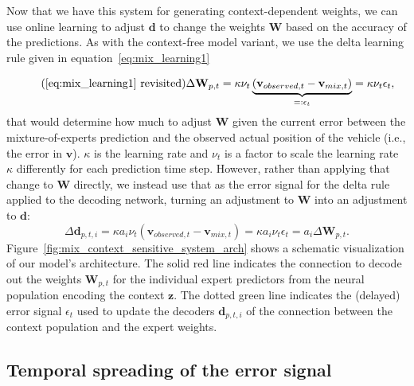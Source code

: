 Now that we have this system for generating context-dependent weights, we can use online learning to adjust $\mathbf{d}$ to change the weights $\mathbf{W}$ based on the accuracy of the predictions. 
As with the context-free model variant, we use the delta learning rule given in equation~\eqref{eq:mix_learning1}  

\begin{equation}
    \tag{\eqref{eq:mix_learning1} revisited}
    \Delta\mathbf{W}_{ p ,t} = \kappa \nu_{t} \underbrace{ \left(\mathbf{v}_{observed,t}-\mathbf{v}_{mix,t}\right)}_{=: \epsilon_t} = \kappa \nu_{t} \epsilon_{t}, 
\end{equation}
that would determine how much to adjust $\mathbf{W}$ given the current error between the mixture-of-experts prediction and the observed actual position of the vehicle (i.e., the error in $\mathbf{v}$).  
$\kappa$ is the learning rate and $\nu_{t}$ is a factor to scale the learning rate $\kappa$ differently for each prediction time step.
However, rather than applying that change to $\mathbf{W}$ directly, we instead use that as the error signal for the delta rule applied to the decoding network, turning an adjustment to $\mathbf{W}$ into an adjustment to $\mathbf{d}$:
\begin{equation}
  \Delta\mathbf{d}_{ p ,t,i} = \kappa a_i \nu_{t} \left(\mathbf{v}_{observed,t}-\mathbf{v}_{mix,t}\right) = \kappa a_i \nu_{t} \epsilon_{t} = a_i \Delta\mathbf{W}_{ p ,t}.
  \label{eq:learning2}
\end{equation}
Figure~\ref{fig:mix_context_sensitive_system_arch} shows a schematic visualization of our model's architecture.
The solid red line indicates the connection to decode out the weights $ \mathbf{W}_{p,t}$ for the individual expert predictors from the neural population encoding the context $ \mathbf{z}$.
The dotted green line indicates the (delayed) error signal $\epsilon_{t}$ used to update the decoders $ \mathbf{d}_{p,t,i}$ of the connection between the context population and the expert weights.

\subsection{Temporal spreading of the error signal}%
\label{subsec:temporal_spreading_of_the_error_signal}

